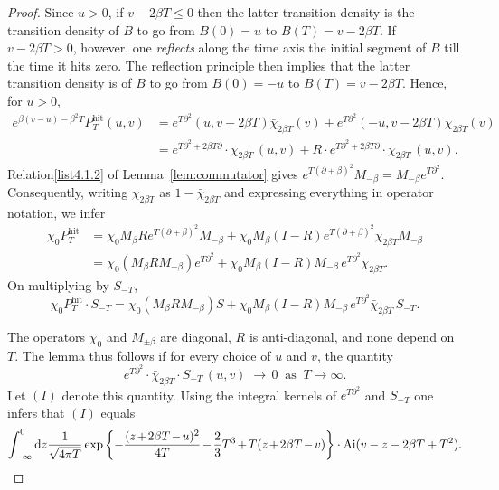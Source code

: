 \documentclass[AHL,Unicode,longabstracts]{cedram}
\newcommand*{\dd}{\mathrm{d}}
\DeclareMathOperator{\hit}{hit}
\DeclareMathOperator{\Ai}{Ai}
\newcommand*{\Mk}{\mkern -2mu}
\begin{document}
\begin{proof}
Since $u > 0$, if $v - 2\beta T \leq 0$ then the latter transition density is the transition density of $B$ to go from $B(0) = u$ to $B(T) = v - 2\beta T$. If $v - 2\beta T > 0$, however, one \emph{reflects} along the time axis the initial segment of $B$ till the time it hits zero. The reflection principle then implies that the latter transition density is of $B$ to go from $B(0) = -u$ to $B(T) = v-2\beta T$. Hence, for $u > 0$,
\begin{align*}
e^{\beta(v-u)-\beta^2T} P^{\hit}_T(u,v) &= e^{T \partial^2}(u, v - 2\beta T) \bar{\chi}_{2\beta T}(v)+e^{T\partial^2}(-u, v-2\beta T) \chi_{2\beta T}(v) \\
& = e^{T\partial^2 + 2\beta T\partial} \cdot \bar{\chi}_{2\beta T}\,(u,v) +R \cdot e^{T\partial^2 + 2\beta T\partial} \cdot \chi_{2\beta T}\,(u,v).
\end{align*}
Relation\eqref{list4.1.2} of Lemma~\ref{lem:commutator} gives $e^{T(\partial + \beta)^2}M_{-\beta} = M_{-\beta}e^{T\partial^2}$. Consequently, writing $\chi_{2\beta T}$ as $1- \bar{\chi}_{2\beta T}$ and expressing everything in operator notation, we infer
\begin{align*}
\chi_0 P^{\hit}_T &= \chi_0 M_{\beta} R e^{T(\partial+\beta)^2}M_{-\beta}+\chi_0 M_{\beta}(I-R)e^{T(\partial+\beta)^2} \chi_{2\beta T} M_{-\beta} \\
&= \chi_0 (M_{\beta}RM_{-\beta})e^{T \partial^2}+\chi_0 M_{\beta}(I-R)M_{-\beta}\,e^{T\partial^2}\bar{\chi}_{2\beta T}.
\end{align*}
On multiplying by $S_{-T}$,
\[
\chi_0 P^{\hit}_T \cdot S_{-T} = \chi_0 (M_{\beta}RM_{-\beta})S +
\chi_0 M_{\beta}(I-R)M_{-\beta}\,e^{T\partial^2}\bar{\chi}_{2\beta T} \, S_{-T}.
\]

The operators $\chi_0$ and $M_{\pm \beta}$ are diagonal, $R$ is anti-diagonal, and none depend on $T$. The lemma thus follows if for every choice of $u$ and $v$, the quantity
\[
e^{T\partial^2} \cdot \bar{\chi}_{2\beta T} \cdot S_{-T}\,(u,v) \; \to\, 0 \;\;\text{as}\;\; T \to \infty.
\]
Let $(I)$ denote this quantity. Using the integral kernels of $e^{T\partial^2}$ and $S_{-T}$ one infers that $(I)$ equals
\[
\int_{-\infty}^0 \dd z \frac{1}{\sqrt{4 \pi T}} \exp \left \{-\frac{(z\Mk+\Mk 2\beta T \Mk-\Mk u)^2}{4T} \Mk-\Mk \frac{2}{3}T^3 \Mk+\Mk T(z\Mk+\Mk 2 \beta T\Mk-\Mk v) \right\} \cdot \Ai(v-z-2\beta T + T^2).
\]


\end{proof}
\end{document}
